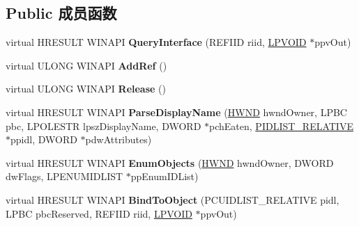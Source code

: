 \subsection*{Public 成员函数}
\begin{DoxyCompactItemize}
\item 
\mbox{\label{class_c_network_connections_afd0be1766fbeea2d7b5261464706dbcd}} 
virtual H\+R\+E\+S\+U\+LT W\+I\+N\+A\+PI {\bfseries Query\+Interface} (R\+E\+F\+I\+ID riid, \hyperlink{interfacevoid}{L\+P\+V\+O\+ID} $\ast$ppv\+Out)
\item 
\mbox{\label{class_c_network_connections_a2cf94e3cac2558191980dcdb62e9653a}} 
virtual U\+L\+O\+NG W\+I\+N\+A\+PI {\bfseries Add\+Ref} ()
\item 
\mbox{\label{class_c_network_connections_a1d09ae6f33452108025ed6963da778b7}} 
virtual U\+L\+O\+NG W\+I\+N\+A\+PI {\bfseries Release} ()
\item 
\mbox{\label{class_c_network_connections_a763742a77e137afc01b7cb46f1459a13}} 
virtual H\+R\+E\+S\+U\+LT W\+I\+N\+A\+PI {\bfseries Parse\+Display\+Name} (\hyperlink{interfacevoid}{H\+W\+ND} hwnd\+Owner, L\+P\+BC pbc, L\+P\+O\+L\+E\+S\+TR lpsz\+Display\+Name, D\+W\+O\+RD $\ast$pch\+Eaten, \hyperlink{struct___i_t_e_m_i_d_l_i_s_t___r_e_l_a_t_i_v_e}{P\+I\+D\+L\+I\+S\+T\+\_\+\+R\+E\+L\+A\+T\+I\+VE} $\ast$ppidl, D\+W\+O\+RD $\ast$pdw\+Attributes)
\item 
\mbox{\label{class_c_network_connections_a6078cb27bfcc4e7a54365418cf41a904}} 
virtual H\+R\+E\+S\+U\+LT W\+I\+N\+A\+PI {\bfseries Enum\+Objects} (\hyperlink{interfacevoid}{H\+W\+ND} hwnd\+Owner, D\+W\+O\+RD dw\+Flags, L\+P\+E\+N\+U\+M\+I\+D\+L\+I\+ST $\ast$pp\+Enum\+I\+D\+List)
\item 
\mbox{\label{class_c_network_connections_a964b6a4764becd9ecdce13d99c79769e}} 
virtual H\+R\+E\+S\+U\+LT W\+I\+N\+A\+PI {\bfseries Bind\+To\+Object} (P\+C\+U\+I\+D\+L\+I\+S\+T\+\_\+\+R\+E\+L\+A\+T\+I\+VE pidl, L\+P\+BC pbc\+Reserved, R\+E\+F\+I\+ID riid, \hyperlink{interfacevoid}{L\+P\+V\+O\+ID} $\ast$ppv\+Out)
\item 
\mbox{\label{class_c_network_connections_a6f2887c07d6684ffd07acc2917be7055}} 

\end{DoxyCompactItemize}
